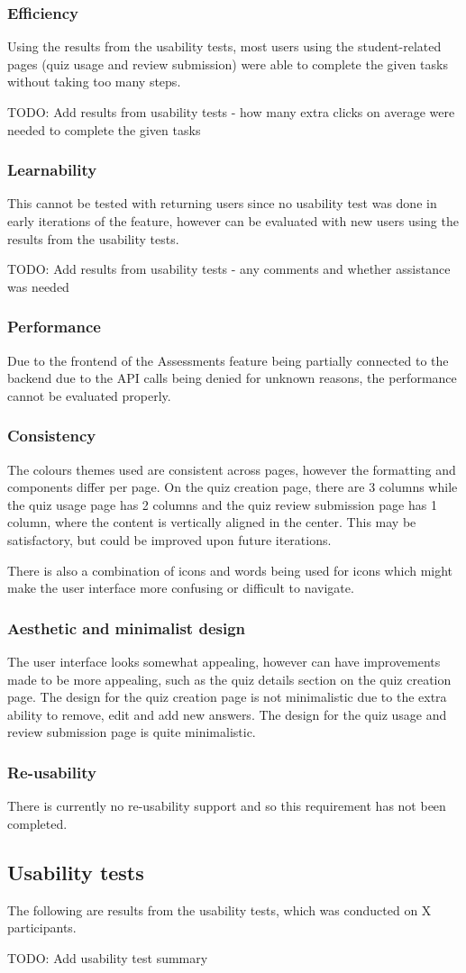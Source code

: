 \subsubsection{Efficiency}
Using the results from the usability tests, most users using the student-related pages (quiz usage and review submission) were able to complete the given tasks without taking too many steps.

TODO: Add results from usability tests - how many extra clicks on average were needed to complete the given tasks

\subsubsection{Learnability}
This cannot be tested with returning users since no usability test was done in early iterations of the feature, however can be evaluated with new users using the results from the usability tests. 

TODO: Add results from usability tests - any comments and whether assistance was needed

\subsubsection{Performance}
Due to the frontend of the Assessments feature being partially connected to the backend due to the API calls being denied for unknown reasons, the performance cannot be evaluated properly.

\subsubsection{Consistency}
The colours themes used are consistent across pages, however the formatting and components differ per page. On the quiz creation page, there are 3 columns while the quiz usage page has 2 columns and the quiz review submission page has 1 column, where the content is vertically aligned in the center. This may be satisfactory, but could be improved upon future iterations.

There is also a combination of icons and words being used for icons which might make the user interface more confusing or difficult to navigate. 

\subsubsection{Aesthetic and minimalist design}
The user interface looks somewhat appealing, however can have improvements made to be more appealing, such as the quiz details section on the quiz creation page. The design for the quiz creation page is not minimalistic due to the extra ability to remove, edit and add new answers. The design for the quiz usage and review submission page is quite minimalistic. 

\subsubsection{Re-usability}
There is currently no re-usability support and so this requirement has not been completed.

\subsection{Usability tests}
The following are results from the usability tests, which was conducted on X participants.

TODO: Add usability test summary
